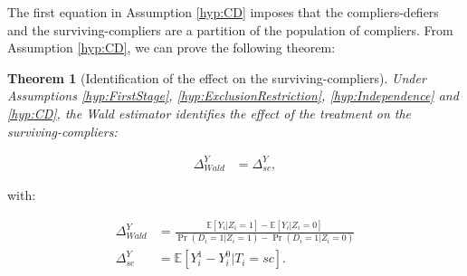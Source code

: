 \documentclass[
]{book}
\newcommand{\esp}[1]{\mathbb{E}[ #1 ]}
\newtheorem{theorem}{Theorem}[chapter]
\theoremstyle{definition}
\theoremstyle{definition}
\theoremstyle{definition}
\theoremstyle{definition}
\theoremstyle{remark}
\begin{document}
The first equation in Assumption \ref{hyp:CD} imposes that the compliers-defiers and the surviving-compliers are a partition of the population of compliers.
From Assumption \ref{hyp:CD}, we can prove the following theorem:

\begin{theorem}[Identification of the effect on the surviving-compliers]
\protect\hypertarget{thm:deChaise}{}{\label{thm:deChaise} \iffalse (Identification of the effect on the surviving-compliers) \fi{} }Under Assumptions \ref{hyp:FirstStage}, \ref{hyp:ExclusionRestriction}, \ref{hyp:Independence} and \ref{hyp:CD}, the Wald estimator identifies the effect of the treatment on the surviving-compliers:

\begin{align*}
  \Delta^Y_{Wald} & = \Delta^Y_{sc},
\end{align*}
\end{theorem}

with:

\begin{align*}
  \Delta^Y_{Wald} & = \frac{\esp{Y_i|Z_i=1} - \esp{Y_i|Z_i=0}}{\Pr(D_i=1|Z_i=1)-\Pr(D_i=1|Z_i=0)}\\
  \Delta^Y_{sc} & = \esp{Y^1_i-Y^0_i|T_i=sc}.
\end{align*}
\end{document}
